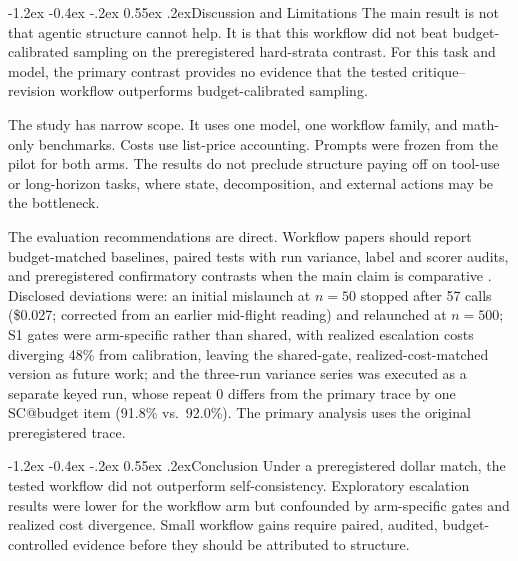 \documentclass[twocolumn,10pt]{article}
\makeatletter
\renewcommand\section{\@startsection{section}{1}{\z@}%
  {-1.2ex \@plus -0.4ex \@minus -.2ex}%
  {0.55ex \@plus .2ex}{\normalfont\large\bfseries}}
\makeatother
\begin{document}
\section{Discussion and Limitations}
The main result is not that agentic structure cannot help. It is that this workflow did not beat budget-calibrated sampling on the preregistered hard-strata contrast. For this task and model, the primary contrast provides no evidence that the tested critique--revision workflow outperforms budget-calibrated sampling.

The study has narrow scope. It uses one model, one workflow family, and math-only benchmarks. Costs use list-price accounting. Prompts were frozen from the pilot for both arms. The results do not preclude structure paying off on tool-use or long-horizon tasks, where state, decomposition, and external actions may be the bottleneck.

The evaluation recommendations are direct. Workflow papers should report budget-matched baselines, paired tests with run variance, label and scorer audits, and preregistered confirmatory contrasts when the main claim is comparative \citep{kapoor2024agents,nosek2018prereg}. Disclosed deviations were: an initial mislaunch at $n=50$ stopped after 57 calls (\$0.027; corrected from an earlier mid-flight reading) and relaunched at $n=500$; S1 gates were arm-specific rather than shared, with realized escalation costs diverging 48\% from calibration, leaving the shared-gate, realized-cost-matched version as future work; and the three-run variance series was executed as a separate keyed run, whose repeat 0 differs from the primary trace by one SC@budget item (91.8\% vs.\ 92.0\%). The primary analysis uses the original preregistered trace.

\section{Conclusion}
Under a preregistered dollar match, the tested workflow did not outperform self-consistency. Exploratory escalation results were lower for the workflow arm but confounded by arm-specific gates and realized cost divergence. Small workflow gains require paired, audited, budget-controlled evidence before they should be attributed to structure.

\clearpage


\end{document}
